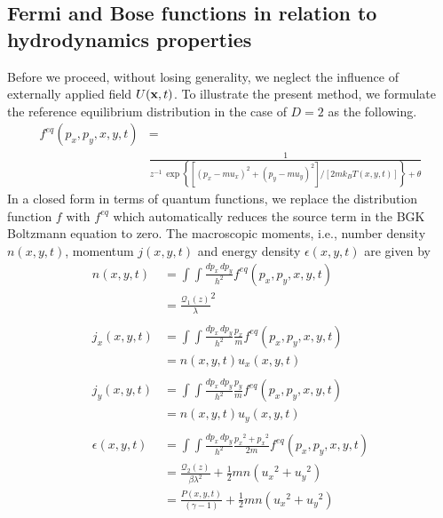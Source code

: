 \documentclass{rsproca}%
\begin{document}


\subsection{Fermi and Bose functions in relation to hydrodynamics properties}
\label{subsec:2_1}

Before we proceed, without losing generality, we neglect the influence of externally applied field \(U({\bf x},t)\). To illustrate the present method, we formulate the reference equilibrium distribution in the case of $D=2$ as the following.
\begin{align}
f^{eq}(p_x,p_y,x,y,t) &= \nonumber \\
&\frac{1}{z^{-1}\,\exp\left\{ \left[ (p_x-mu_x)^2 + (p_y-mu_y)^2 \right]/\left[2mk_BT(x,y,t)\right]\right\}+\theta}
\end{align}
In a closed form in terms of quantum functions, we replace the distribution function $f$ with $f^{eq}$ which automatically reduces the source term in the BGK Boltzmann equation to zero. The macroscopic moments, i.e., number density \(n(x,y,t)\), momentum \(j(x,y,t)\) and energy density \(\epsilon(x,y,t)\) are given by
\begin {align}
n(x,y,t) &= \int\int{\frac{dp_x\,dp_y}{h^2}f^{eq}(p_x,p_y,x,y,t)}\nonumber \\
&= \frac{\mathcal{Q}_{1}(z)}{\lambda}^2  \\
\nonumber \\
j_x(x,y,t) &= \int\int{\frac{dp_x\,dp_y}{h^2}\frac{p_x}{m}f^{eq}(p_x,p_y,x,y,t)}\nonumber \\
&= n(x,y,t)u_x(x,y,t)  \\
\nonumber \\
j_y(x,y,t) &= \int\int{\frac{dp_x\,dp_y}{h^2}\frac{p_y}{m}f^{eq}(p_x,p_y,x,y,t)}\nonumber \\
&= n(x,y,t)u_y(x,y,t)  \\
\nonumber \\
\epsilon(x,y,t) &= \int\int{\frac{dp_x\,dp_y}{h^2}\frac{{p_x}^2+{p_x}^2}{2m}f^{eq}(p_x,p_y,x,y,t)}\nonumber \\
&= \frac{\mathcal{Q}_{2}(z)}{\beta\lambda^2}+\frac{1}{2}mn({u_x}^2+{u_y}^2)\nonumber \\
&= \frac{P(x,y,t)}{(\gamma - 1)}+\frac{1}{2}mn({u_x}^2+{u_y}^2)
\end{align}
\end{document}
